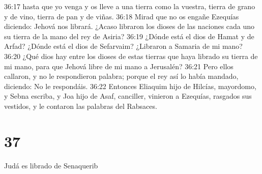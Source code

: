 36:17 hasta que yo venga y os lleve a una tierra como la vuestra, tierra de grano y de vino, tierra de pan y de viñas.  
36:18 Mirad que no os engañe Ezequías diciendo: Jehová nos librará. ¿Acaso libraron los dioses de las naciones cada uno su tierra de la mano del rey de Asiria?  
36:19 ¿Dónde está el dios de Hamat y de Arfad? ¿Dónde está el dios de Sefarvaim? ¿Libraron a Samaria de mi mano?  
36:20 ¿Qué dios hay entre los dioses de estas tierras que haya librado su tierra de mi mano, para que Jehová libre de mi mano a Jerusalén?  
36:21 Pero ellos callaron, y no le respondieron palabra; porque el rey así lo había mandado, diciendo: No le respondáis.  
36:22 Entonces Eliaquim hijo de Hilcías, mayordomo, y Sebna escriba, y Joa hijo de Asaf, canciller, vinieron a Ezequías, rasgados sus vestidos, y le contaron las palabras del Rabsaces.  

\chapter{37}

Judá es librado de Senaquerib  

